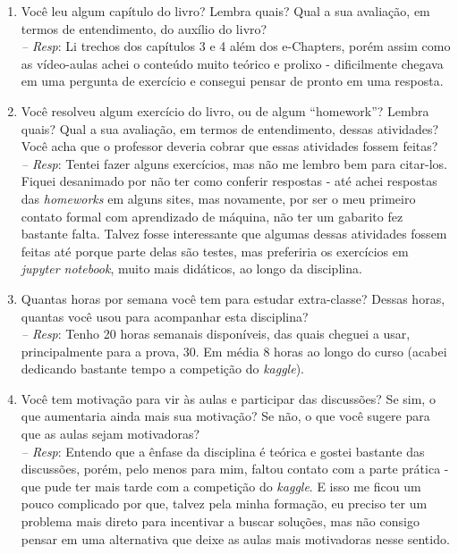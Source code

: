 \documentclass[12pt]{article}
\begin{document}
\begin{enumerate}
\begin{enumerate}
		\item Você leu algum capítulo do livro? Lembra quais? Qual a sua avaliação, em
		termos de entendimento, do auxílio do livro?\\
		\textit{-- Resp}: Li trechos dos capítulos 3 e 4 além dos e-Chapters, porém assim como as vídeo-aulas achei o conteúdo muito teórico e prolixo - dificilmente chegava em uma pergunta de exercício e consegui pensar de pronto em uma resposta.\\
		
		\item Você resolveu algum exercício do livro, ou de algum ``homework''? Lembra quais? 
		Qual a sua avaliação, em termos de entendimento, dessas atividades? Você acha que o professor 
		deveria cobrar que essas atividades fossem feitas?\\
		\textit{-- Resp}: Tentei fazer alguns exercícios, mas não me lembro bem para citar-los. Fiquei desanimado por não ter como conferir respostas - até achei respostas das \textit{homeworks} em alguns sites, mas novamente, por ser o meu primeiro contato formal com aprendizado de máquina, não ter um gabarito fez bastante falta. Talvez fosse interessante que algumas dessas atividades fossem feitas até porque parte delas são testes, mas preferiria os exercícios em \textit{jupyter notebook}, muito mais didáticos, ao longo da disciplina.\\
		
		\item Quantas horas por semana você tem para estudar extra-classe? Dessas horas, quantas você 
		usou para acompanhar esta disciplina?\\
		\textit{-- Resp}: Tenho 20 horas semanais disponíveis, das quais cheguei a usar, principalmente para a prova, 30. Em média 8 horas ao longo do curso (acabei dedicando bastante tempo a competição do \textit{kaggle}).\\
		
		\item Você tem motivação para vir às aulas e participar das discussões? Se sim, o que aumentaria 
		ainda mais sua motivação? Se não, o que você sugere para que as aulas sejam motivadoras?\\
		\textit{-- Resp}: Entendo que a ênfase da disciplina é teórica e gostei bastante das discussões, porém, pelo menos para mim, faltou contato com a parte prática - que pude ter mais tarde com a competição do \textit{kaggle}. E isso me ficou um pouco complicado por que, talvez pela minha formação, eu preciso ter um problema mais direto para incentivar a buscar soluções, mas não consigo pensar em uma alternativa que deixe as aulas mais motivadoras nesse sentido.\\
		

\end{enumerate}
\end{enumerate}
\end{document}
